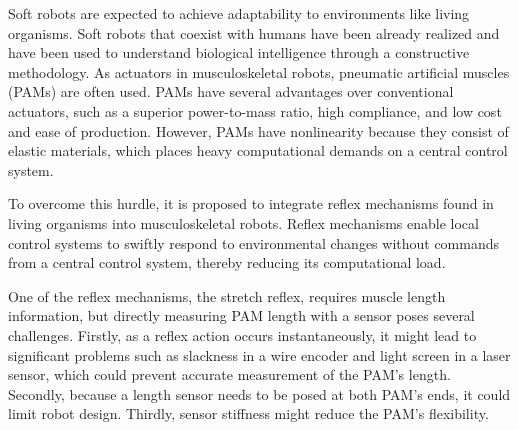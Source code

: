 Soft robots are expected to achieve adaptability to environments like living organisms\cite{rus_design_2015}. 
Soft robots that coexist with humans have been already realized\cite{Compac,polygerinos_soft_2015} and have been used to understand biological intelligence through a constructive methodology\cite{hosoda,marchese_autonomous}.
As actuators in musculoskeletal robots, pneumatic artificial muscles (PAMs) are often used\cite{mirvakili_artificial}.
PAMs have several advantages over conventional actuators, such as a superior power-to-mass ratio\cite{Dynamic}, high compliance\cite{SDCharacteristics}, and low cost and ease of production\cite{ashwin_survey_2018}.
However, PAMs have nonlinearity because they consist of elastic materials, which places heavy computational demands on a central control system.

To overcome this hurdle, it is proposed to integrate reflex mechanisms found in living organisms into musculoskeletal robots\cite{takahashi}.
Reflex mechanisms enable local control systems to swiftly respond to environmental changes without commands from a central control system, thereby reducing its computational load. 

One of the reflex mechanisms, the stretch reflex, requires muscle length information\cite{kandel}, but directly measuring PAM length with a sensor poses several challenges\cite{nakajima}.
Firstly, as a reflex action occurs instantaneously, it might lead to significant problems such as slackness in a wire encoder and light screen in a laser sensor, 
which could prevent accurate measurement of the PAM's length. 
Secondly, because a length sensor needs to be posed at both PAM's ends, it could limit robot design. 
Thirdly, sensor stiffness might reduce the PAM's flexibility.

